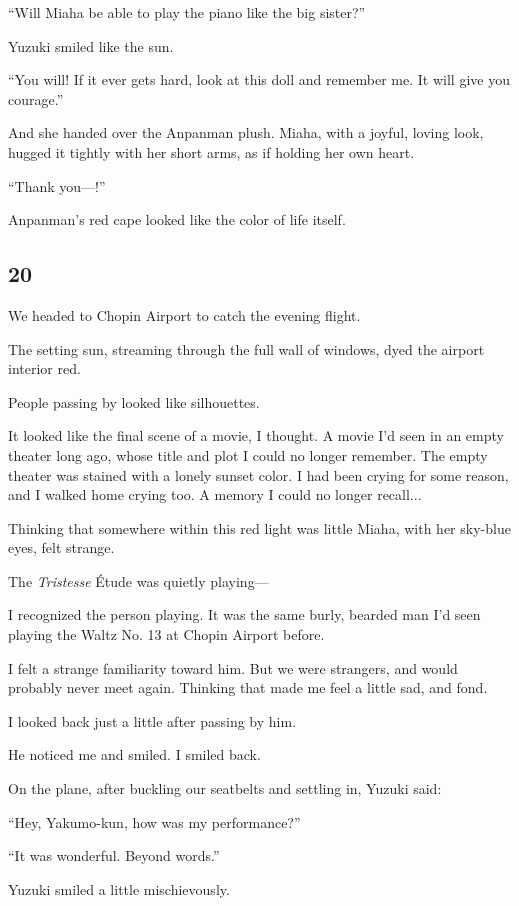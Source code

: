 \documentclass[
    a4paper,
    12pt,
    twoside,
    openany,
    UTF8,
    fontset=windows
]{ctexbook}
\begin{document}
``Will Miaha be able to play the piano like the big sister?''

Yuzuki smiled like the sun.

``You will! If it ever gets hard, look at this doll and remember me. It will give you courage.''

And she handed over the Anpanman plush. Miaha, with a joyful, loving look, hugged it tightly with her short arms, as if holding her own heart.

``Thank you---!''

Anpanman's red cape looked like the color of life itself.


\subsection*{20}

We headed to Chopin Airport to catch the evening flight.

The setting sun, streaming through the full wall of windows, dyed the airport interior red.

People passing by looked like silhouettes.

It looked like the final scene of a movie, I thought. A movie I'd seen in an empty theater long ago, whose title and plot I could no longer remember. The empty theater was stained with a lonely sunset color. I had been crying for some reason, and I walked home crying too. A memory I could no longer recall...

Thinking that somewhere within this red light was little Miaha, with her sky-blue eyes, felt strange.

The \textit{Tristesse} Étude was quietly playing---

I recognized the person playing. It was the same burly, bearded man I'd seen playing the Waltz No. 13 at Chopin Airport before.

I felt a strange familiarity toward him. But we were strangers, and would probably never meet again. Thinking that made me feel a little sad, and fond.

I looked back just a little after passing by him.

He noticed me and smiled. I smiled back.

On the plane, after buckling our seatbelts and settling in, Yuzuki said:

``Hey, Yakumo-kun, how was my performance?''

``It was wonderful. Beyond words.''

Yuzuki smiled a little mischievously.
\end{document}
